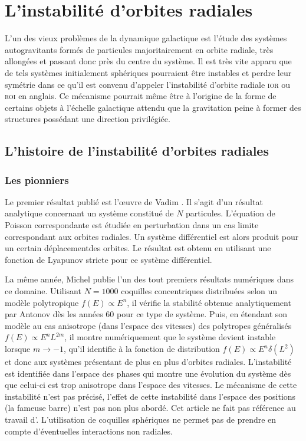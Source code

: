 \section{L'instabilité d'orbites radiales}
\label{Chap::Sec::ROI}

L'un des vieux problèmes de la dynamique galactique est l'étude des systèmes autogravitants formés de particules majoritairement en orbite radiale,
très allongées et passant donc près du centre du système. Il est très vite apparu que de tels systèmes initialement sphériques pourraient être
instables et perdre leur symétrie dans ce qu'il est convenu d'appeler l'instabilité d'orbite radiale \textsc{ior} ou \textsc{roi} en anglais. Ce
mécanisme pourrait même être à l'origine de la forme de certains objets à l'échelle galactique attendu que la gravitation peine à former des
structures possédant une direction privilégiée.


\subsection{L'histoire de l'instabilité d'orbites radiales}

\subsubsection{Les pionniers}

Le premier résultat publié est l'œuvre de Vadim \cite{antonov}. Il s'agit d'un résultat analytique concernant un système constitué de $N$ particules.
L'équation de Poisson correspondante est étudiée en perturbation dans un cas limite correspondant aux orbites radiales. Un système différentiel est
alors produit pour un certain \og déplacement\fg des orbites. Le résultat est obtenu en utilisant une fonction de Lyapunov stricte pour ce système
différentiel.

La même année, Michel \cite{henon} publie l'un des tout premiers résultats numériques dans ce domaine. Utilisant $N=1000$ coquilles concentriques
distribuées selon un modèle polytropique $f\left(  E\right)  \propto E^{n}$, il vérifie la stabilité obtenue analytiquement par Antonov dès les années
60 pour ce type de système. Puis, en étendant son modèle au cas anisotrope (dans l'espace des vitesses) des polytropes généralisés  $f\left(  E\right)
\propto E^{n}L^{2m}$, il montre numériquement que le système devient instable lorsque $m\rightarrow-1$, qu'il identifie à la fonction de distribution
$f\left(  E\right)  \propto E^{n}\delta\left(  L^{2}\right) $ et donc aux systèmes présentant de plus en plus d'orbites radiales. L'instabilité est
identifiée dans l'espace des phases qui montre une évolution du système dès que celui-ci est trop anisotrope dans l'espace des vitesses. Le mécanisme
de cette instabilité n'est pas précisé, l'effet de cette instabilité dans l'espace des positions (la fameuse barre) n'est pas non plus abordé. Cet
article ne fait pas référence au travail d'\cite{antonov}. L'utilisation de coquilles sphériques ne permet pas de prendre en compte d'éventuelles
interactions non radiales.

